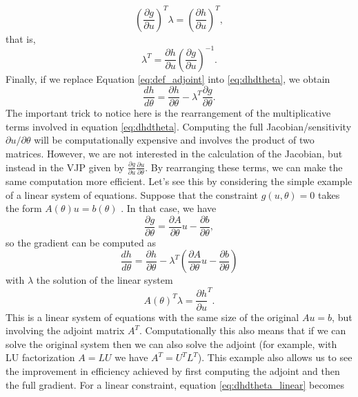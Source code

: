 \begin{equation}
    \left( \frac{\partial g}{\partial u}\right)^T \lambda =  \left( \frac{\partial h}{\partial u} \right)^T,
\end{equation}
that is,
\begin{equation}
    \lambda^T = \frac{\partial h}{\partial u} \left( \frac{\partial g}{\partial u} \right)^{-1}.
    \label{eq:def_adjoint}
\end{equation}
Finally, if we replace Equation \eqref{eq:def_adjoint} into \eqref{eq:dhdtheta}, we obtain 
\begin{equation}
    \frac{dh}{d\theta} 
    =
    \frac{\partial h}{\partial \theta} - \lambda^T \frac{\partial g}{\partial \theta}.
\end{equation}
The important trick to notice here is the rearrangement of the multiplicative terms involved in equation \eqref{eq:dhdtheta}. Computing the full Jacobian/sensitivity $\partial u / \partial \theta$ will be computationally expensive and involves the product of two matrices. However, we are not interested in the calculation of the Jacobian, but instead in the VJP given by $\frac{\partial g}{\partial u} \frac{\partial u}{\partial \theta}$. By rearranging these terms, we can make the same computation more efficient. 
Let's see this by considering the simple example of a linear system of equations. Suppose that the constraint $g(u, \theta)=0$ takes the form $A(\theta) u = b(\theta)$ \cite{Johnson}. In that case, we have
\begin{equation}
    \frac{\partial g}{\partial \theta} = \frac{\partial A }{\partial \theta} u - \frac{\partial b}{\partial \theta},
\end{equation}
so the gradient can be computed as 
\begin{equation}
    \frac{dh}{d\theta} = \frac{\partial h}{\partial \theta} - \lambda^T \left( \frac{\partial A }{\partial \theta} u - \frac{\partial b}{\partial \theta} \right)
    \label{eq:dhdtheta_linear}
\end{equation}
with $\lambda$ the solution of the linear system 
\begin{equation}
    A(\theta)^T \lambda = \frac{\partial h}{\partial u}^T.
\end{equation}
This is a linear system of equations with the same size of the original $Au = b$, but involving the adjoint matrix $A^T$. Computationally this also means that if we can solve the original system then we can also solve the adjoint (for example, with LU factorization $A=LU$ we have $A^T=U^TL^T$).
This example also allows us to see the improvement  in efficiency achieved by first computing the adjoint and then the full gradient. For a linear constraint, equation \eqref{eq:dhdtheta_linear} becomes
